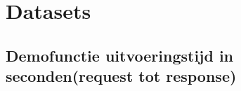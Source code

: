 \section{Datasets}
\subsection{Demofunctie uitvoeringstijd in seconden(request tot response)}
\label{sec:demofunctie-uitvoeringstijd}
